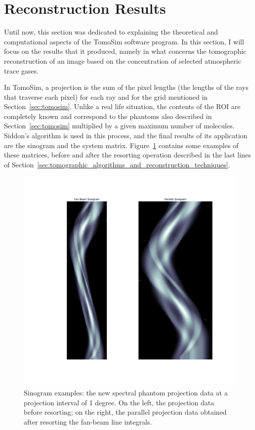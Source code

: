 \section{Reconstruction Results}%
\label{sec:reconstruction_results}

Until now, this section was dedicated to explaining the theoretical and
computational aspects of the TomoSim software program.  In this section,
I will focus on the results that it produced, namely in what concerns
the tomographic reconstruction of an image based on the concentration of
selected atmospheric trace gases.

In TomoSim, a projection is the sum of the pixel lengths (the lengths of
the rays that traverse each pixel) for each ray and for the grid
mentioned in Section~\ref{sec:tomosim}. Unlike a real life situation,
the contents of the ROI are completely known and correspond to the
phantoms also described in Section~\ref{sec:tomosim} multiplied by a
given maximum number of molecules. Siddon's algorithm is used in this
process, and the final results of its application are the sinogram and
the system matrix. Figure~\ref{fig:sinograms} contains some examples of
these matrices, before and after the resorting operation described in
the last lines of
Section~\ref{sec:tomographic_algorithms_and_reconstruction_techniques}.

\begin{figure}[htpb]
    \centering
    \includegraphics[clip, trim=7cm 4cm 3.2cm 3.5cm,
    width=.6\textwidth]{img/pdf/fanbeam_comparison.pdf}
    \caption{Sinogram examples: the new spectral phantom projection data
    at a projection interval of 1 degree. On the left, the projection
    data before resorting; on the right, the parallel projection data
    obtained after resorting the fan-beam line integrals.}
    \label{fig:sinograms}
\end{figure}

